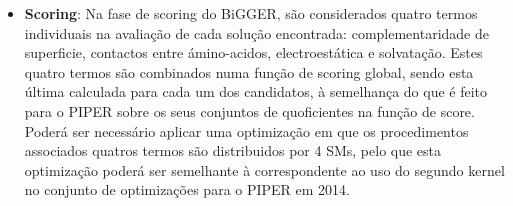 \begin{itemize}
\item{\textbf{Scoring}}: Na fase de scoring do BiGGER, são considerados quatro termos individuais na avaliação de cada solução encontrada: complementaridade de superficie, contactos entre ámino-acidos, electroestática e solvatação. Estes quatro termos são combinados numa função de scoring global, sendo esta última calculada para cada um dos candidatos, à semelhança do que é feito para o PIPER sobre os seus conjuntos de quoficientes na função de score. Poderá ser necessário aplicar uma optimização em que os procedimentos associados quatros termos são distribuidos por 4 SMs, pelo que esta optimização poderá ser semelhante à correspondente ao uso do segundo kernel no conjunto de optimizações para o PIPER em 2014.
\end{itemize}
